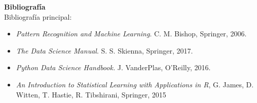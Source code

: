 \documentclass[letterpaper,10pt,onecolumn]{article}
\begin{document}
\vspace*{0.5cm} 

\noindent\textbf{\large {} \quad
  Bibliograf\'ia}\\[-0.2cm] 



\noindent\normalsize Bibliograf\'ia principal:

\begin{itemize}


\item
\textit{Pattern Recognition and Machine Learning}. C. M. Bishop, 
Springer, 2006.\\[-0.6cm]

\item 
\textit{The Data Science Manual}. S. S. Skienna, Springer, 2017.\\[-0.6cm]

\item
\textit{Python Data Science Handbook.} J. VanderPlas, O'Reilly, 2016.\\[-0.6cm]

\item 
\textit{An Introduction to Statistical Learning with Applications in
  R}, G. James, D. Witten, T. Hastie, R. Tibshirani, Springer, 2015 \\[-0.6cm]
\end{itemize}
\end{document}
